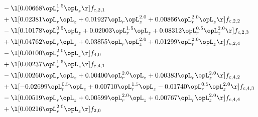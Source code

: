 \begin{alignat}{2}
& - \l[  0.00668 \opL_r^{1.5} \opL_z  \r] f_{c,2,1} \nonumber \\ 
& + \l[  0.02381 \opL_r \opL_z +  0.01927 \opL_r \opL_z^{2.0} +  0.00866 \opL_r^{2.0} \opL_z  \r] f_{c,2,2} \nonumber \\ 
& - \l[  0.10178 \opL_r^{0.5} \opL_z +  0.02003 \opL_r^{1.5} \opL_z +  0.08312 \opL_r^{0.5} \opL_z^{2.0}  \r] f_{c,2,3} \nonumber \\ 
& + \l[  0.04762 \opL_r \opL_z +  0.03855 \opL_r \opL_z^{2.0} +  0.01299 \opL_r^{2.0} \opL_z  \r] f_{c,2,4} \nonumber \\ 
& - \l[  0.00100 \opL_r^{2.0} \opL_z  \r] f_{4,0} \nonumber \\ 
& + \l[  0.00237 \opL_r^{1.5} \opL_z  \r] f_{c,4,1} \nonumber \\ 
& - \l[  0.00260 \opL_r \opL_z +  0.00400 \opL_r^{2.0} \opL_z +  0.00383 \opL_r \opL_z^{2.0}  \r] f_{c,4,2} \nonumber \\ 
& + \l[  -0.02699 \opL_r^{0.5} \opL_z +  0.00710 \opL_r^{1.5} \opL_z   -0.01740 \opL_r^{0.5} \opL_z^{2.0}  \r] f_{c,4,3} \nonumber \\ 
& - \l[  0.00519 \opL_r \opL_z +  0.00599 \opL_r^{2.0} \opL_z +  0.00767 \opL_r \opL_z^{2.0}  \r] f_{c,4,4} \nonumber \\ 
& + \l[  0.00216 \opL_r^{2.0} \opL_z  \r] f_{2,0} \nonumber \\ 
\end{alignat} 


